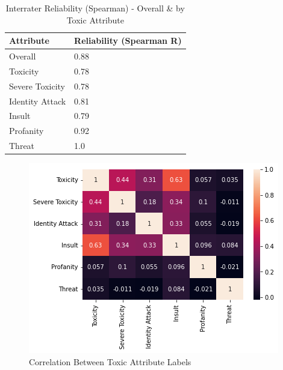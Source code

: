 \documentclass[11pt]{article}
\begin{document}
\begin{table}[h]
\centering
\begin{tabular}{ll}
\hline
Attribute       & Reliability (Spearman R) \\ \hline
Overall         & 0.88                     \\ \hline
Toxicity        & 0.78                     \\
Severe Toxicity & 0.78                     \\
Identity Attack & 0.81                     \\
Insult          & 0.79                     \\
Profanity       & 0.92                     \\
Threat          & 1.0                      \\ \hline
\end{tabular}
\caption{\label{interrater-summary}
Interrater Reliability (Spearman) - Overall \& by Toxic Attribute }
\end{table}
\begin{figure}[h]
    \centering
    \caption{\label{heatmap-corr}  Correlation Between Toxic Attribute Labels}
    \includegraphics[scale=0.7]{reporting/latex/heatmap-corr.png}
\end{figure}
\end{document}
